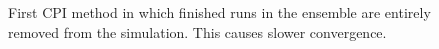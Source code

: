 \documentclass[11pt]{article}
\begin{document}
\begin{figure}
  \centering
  \hspace{3mm}
  \caption{First CPI method in which finished runs in the ensemble are entirely removed from the simulation. This causes slower convergence.}
  \label{fig:vmSlow}
\end{figure}
\end{document}
